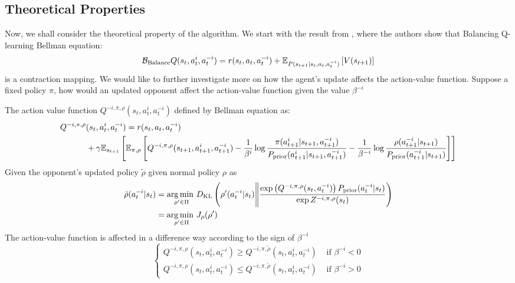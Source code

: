 \subsection{Theoretical Properties}
\label{sec:chap3-balancing-Q-theoretical}
Now, we shall consider the theoretical property of the algorithm. We start with the result from \cite{grau2018balancing}, where the authors show that Balancing Q-learning Bellman equation:
\begin{equation}
    \mathcal{B}_{\text{Balance}} Q(s_t, a^i_t, a^{-i}_t) = r(s_t, a_t, a^{-i}_t) + \mathbb{E}_{P(s_{t+1} | s_t, a_t, a^{-i}_t)}\left[ V(s_{t+1}) \right]
\end{equation}
is a contraction mapping. We would like to further investigate more on how the agent's update affects the action-value function. Suppose a fixed policy $\pi$, how would an updated opponent affect the action-value function given the value $\beta^{-i}$
\begin{theorem}
\label{thm:update-balance-opponent}
    The action value function $Q^{-i, \pi, \rho}(s_t, a^i_t, a^{-i}_t)$ defined by Bellman equation as:
    \begin{equation}
    \begin{aligned}
        Q^{-i, \pi, \rho}&(s_t, a^i_t, a^{-i}_t) = r(s_t, a_t, a^{-i}_t) \\
        &+ \gamma\mathbb{E}_{s_{t+1}}\left[ \mathbb{E}_{\pi, \rho}\left[ Q^{-i, \pi, \rho}(s_{t+1}, a^i_{t+1}, a^{-i}_{t+1}) - \frac{1}{\beta^i} \log\frac{\pi(a^i_{t+1}|s_{t+1}, a^{-i}_{t+1})}{P_{\text{prior}}(a^i_{t+1}|s_{t+1}, a^{-i}_{t+1})} - \frac{1}{\beta^{-i}}\log \frac{\rho(a^{-i}_{t+1}|s_{t+1})}{P_{\text{prior}}(a^{-i}_{t+1}|s_{t+1})} \right] \right]
    \end{aligned}
    \end{equation}
    Given the opponent's updated policy $\tilde{\rho}$ given normal policy $\rho$ as 
    \begin{equation}
    \begin{aligned}
        \tilde{\rho}(a^{-i}_t | s_t) &= \underset{\rho' \in \Pi}{\arg\min \ } D_{\mathrm{KL}} \left(  \rho'(a^{-i}_t | s_t) \Bigg\| \frac{\exp\left( Q^{-i, \pi, \rho}(s_t, a^{-i}_t) \right) P_{\text{prior}}(a^{-i}_t | s_t)}{\exp Z^{-i, \pi, \rho}(s_t)} \right) \\
        &=\underset{\rho' \in \Pi}{\arg\min \ } J_{\rho}(\rho')
    \end{aligned}
    \end{equation}
    The action-value function is affected in a difference way according to the sign of $\beta^{-i}$
    \begin{equation}
    \begin{cases}
        Q^{-i, \pi, \rho}(s_t, a^i_t, a^{-i}_t) \ge Q^{-i, \pi, \tilde{\rho}}(s_t, a^i_t, a^{-i}_t) &\text{ if } \beta^{-i} < 0 \\
        Q^{-i, \pi, \rho}(s_t, a^i_t, a^{-i}_t) \le Q^{-i, \pi, \tilde{\rho}}(s_t, a^i_t, a^{-i}_t)&\text{ if } \beta^{-i} > 0
    \end{cases}
    \end{equation}
\end{theorem}
